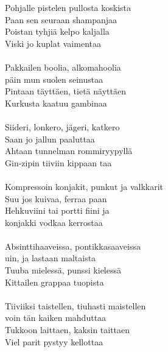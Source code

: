 
            Pohjalle pistelen pullosta koskista \\
            Paan sen seuraan shampanjaa \\
            Poistan tyhjiä kelpo kaljalla \\
            Viski jo kuplat vaimentaa \\
\hspace{10mm} \\
            Pakkailen boolia, alkomahoolia \\
            päin mun suolen seinustaa \\
            Pintaan täyttäen, tietä näyttäen \\
            Kurkusta kaatuu gambinaa \\
\hspace{10mm} \\
            Siideri, lonkero, jägeri, katkero \\
            Saan jo jallun paaluttaa \\
            Ahtaan tunnelman rommiryypyllä \\
            Gin-zipin tiiviin kippaan taa \\
\hspace{10mm} \\
            Kompressoin konjakit, punkut ja valkkarit \\
            Suu jos kuivaa, ferraa paan \\
            Hehkuviini tai portti fiini ja \\
            konjakki vodkaa kerrostaa \\
\hspace{10mm} \\
            Absinttihaaveissa, pontikkasaaveissa \\
            uin, ja lastaan maltaista \\
            Tuuba mielessä, punssi kielessä \\
            Kittailen grappaa tuopista \\
\hspace{10mm} \\
            Tiiviiksi taistellen, tiuhasti maistellen \\
            voin tän kaiken mahduttaa \\
            Tukkoon laittaen, kaksin taittaen \\
            Viel parit pystyy kellottaa \\
